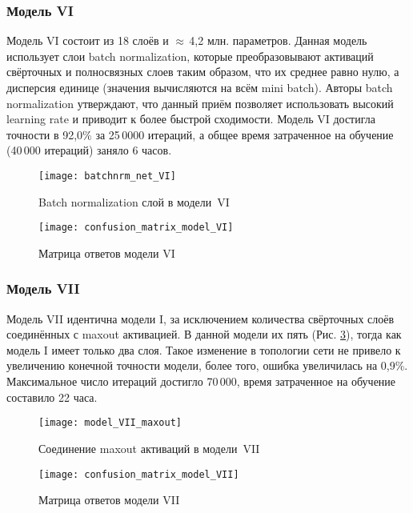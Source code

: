 \subsubsection{Модель VI}
Модель VI состоит из 18 слоёв и $\approx$\,4,2 млн. параметров. Данная модель использует слои batch normalization, 
которые преобразовывают активаций свёрточных и полносвязных слоев таким образом, что их среднее равно нулю, а
дисперсия единице (значения вычисляются на всём mini batch). Авторы batch normalization \cite{DBLP:journals/corr/IoffeS15}
утверждают, что данный приём позволяет использовать высокий learning rate и приводит к более быстрой сходимости.
Модель VI достигла точности в 92,0\% за 25\,0000 итераций, а общее время затраченное на обучение (40\,000 итераций)
заняло 6 часов.
\begin{figure}[H]
    \centering
    \texttt{[image: batchnrm\_net\_VI]}
    \caption{Batch normalization слой в модели~VI}
    \label{fig:model_VI_bnrm}
\end{figure}

\begin{figure}[H]
    \centering
    \texttt{[image: confusion\_matrix\_model\_VI]}
    \vspace*{-0.5cm}
    \caption{Матрица ответов модели VI}
    \label{fig:confusion_matrix_model_VI}
\end{figure}

\subsubsection{Модель VII}
Модель VII идентична модели I, за исключением количества свёрточных слоёв соединённых с maxout активацией. В данной модели их пять
(Рис. \ref{fig:model_VII_maxout}), тогда как модель I имеет только два слоя. Такое изменение в топологии сети не привело к 
увеличению конечной точности модели, более того, ошибка увеличилась на 0,9\%. Максимальное число итераций достигло 70\,000,
время затраченное на обучение составило 22 часа.
\begin{figure}[H]
    \centering
    \texttt{[image: model\_VII\_maxout]}
    \caption{Соединение maxout активаций в модели~VII}
    \label{fig:model_VII_maxout}
\end{figure}

\begin{figure}[H]
    \centering
    \texttt{[image: confusion\_matrix\_model\_VII]}
    \vspace*{-0.5cm}
    \caption{Матрица ответов модели VII}
    \label{fig:confusion_matrix_model_VII}
\end{figure}

